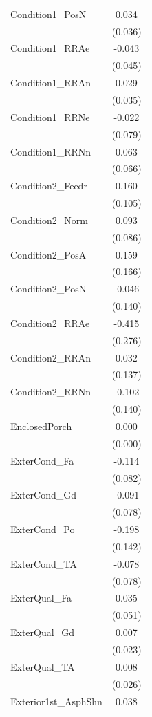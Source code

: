 \begin{table}[!htbp]
\begin{tabular}{@{\extracolsep{5pt}}lc}
 Condition1\_PosN & 0.034$^{}$ \\
& (0.036) \\
 Condition1\_RRAe & -0.043$^{}$ \\
& (0.045) \\
 Condition1\_RRAn & 0.029$^{}$ \\
& (0.035) \\
 Condition1\_RRNe & -0.022$^{}$ \\
& (0.079) \\
 Condition1\_RRNn & 0.063$^{}$ \\
& (0.066) \\
 Condition2\_Feedr & 0.160$^{}$ \\
& (0.105) \\
 Condition2\_Norm & 0.093$^{}$ \\
& (0.086) \\
 Condition2\_PosA & 0.159$^{}$ \\
& (0.166) \\
 Condition2\_PosN & -0.046$^{}$ \\
& (0.140) \\
 Condition2\_RRAe & -0.415$^{}$ \\
& (0.276) \\
 Condition2\_RRAn & 0.032$^{}$ \\
& (0.137) \\
 Condition2\_RRNn & -0.102$^{}$ \\
& (0.140) \\
 EnclosedPorch & 0.000$^{}$ \\
& (0.000) \\
 ExterCond\_Fa & -0.114$^{}$ \\
& (0.082) \\
 ExterCond\_Gd & -0.091$^{}$ \\
& (0.078) \\
 ExterCond\_Po & -0.198$^{}$ \\
& (0.142) \\
 ExterCond\_TA & -0.078$^{}$ \\
& (0.078) \\
 ExterQual\_Fa & 0.035$^{}$ \\
& (0.051) \\
 ExterQual\_Gd & 0.007$^{}$ \\
& (0.023) \\
 ExterQual\_TA & 0.008$^{}$ \\
& (0.026) \\
 Exterior1st\_AsphShn & 0.038$^{}$ \\

\end{tabular}
\end{table}
